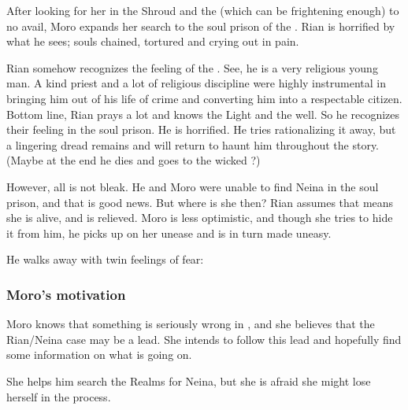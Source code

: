 After looking for her in the Shroud and the \Wylde{} (which can be frightening enough) to no avail, Moro expands her search to the soul prison of the \Sephiroth{}. Rian is horrified by what he sees; souls chained, tortured and crying out in pain. 

Rian somehow recognizes the feeling of the \Sephiroth. See, he is a very religious young man. A kind priest and a lot of religious discipline were highly instrumental in bringing him out of his life of crime and converting him into a respectable citizen. Bottom line, Rian prays a lot and knows the Light and the \Sephiroth{} well. So he recognizes their feeling in the soul prison. He is horrified. He tries rationalizing it away, but a lingering dread remains and will return to haunt him throughout the story. (Maybe at the end he dies and goes to the wicked \Sephiroth?) 

However, all is not bleak. He and Moro were unable to find Neina in the soul prison, and that is good news. But where is she then? Rian assumes that means she is alive, and is relieved. Moro is less optimistic, and though she tries to hide it from him, he picks up on her unease and is in turn made uneasy. 

He walks away with twin feelings of fear: 







\subsubsection{Moro's motivation}
Moro knows that something is seriously wrong in \Malcur, and she believes that the Rian/Neina case may be a lead. 
She intends to follow this lead and hopefully find some information on what is going on. 

She helps him search the Realms for Neina, but she is afraid she might lose herself in the process. 

